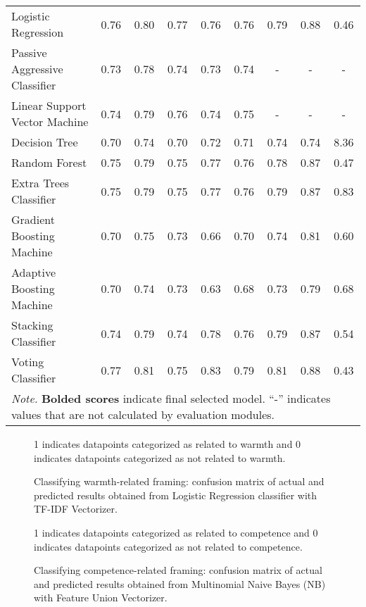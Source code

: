\documentclass[jou]{apa7}
\begin{document}
\begin{landscape}
\begin{longtable}[l]{lcccccccc}
    Logistic Regression & 0.76 & 0.80 & 0.77 & 0.76 & 0.76 & 0.79 & 0.88 & 0.46 \\
    Passive Aggressive Classifier & 0.73 & 0.78 & 0.74 & 0.73 & 0.74 & - & - & - \\
    Linear Support Vector Machine & 0.74 & 0.79 & 0.76 & 0.74 & 0.75 & - & - & - \\
    Decision Tree & 0.70 & 0.74 & 0.70 & 0.72 & 0.71 & 0.74 & 0.74 & 8.36 \\
    Random Forest & 0.75 & 0.79 & 0.75 & 0.77 & 0.76 & 0.78 & 0.87 & 0.47 \\
    Extra Trees Classifier & 0.75 & 0.79 & 0.75 & 0.77 & 0.76 & 0.79 & 0.87 & 0.83 \\
    Gradient Boosting Machine & 0.70 & 0.75 & 0.73 & 0.66 & 0.70 & 0.74 & 0.81 & 0.60 \\
    Adaptive Boosting Machine & 0.70 & 0.74 & 0.73 & 0.63 & 0.68 & 0.73 & 0.79 & 0.68 \\
    Stacking Classifier & 0.74 & 0.79 & 0.74 & 0.78 & 0.76 & 0.79 & 0.87 & 0.54 \\
    Voting Classifier & 0.77 & 0.81 & 0.75 & 0.83 & 0.79 & 0.81 & 0.88 & 0.43 \\ \hline
    \multicolumn{9}{l}{\textit{Note.} \textbf{Bolded scores} indicate final selected model. “-” indicates values that are not calculated by evaluation modules.}
    \end{longtable}
    \end{landscape}

\begin{figure*}
    \caption{Classifying warmth-related framing: confusion matrix of actual and predicted results obtained from Logistic Regression classifier with TF-IDF Vectorizer.}
    \label{figure6}
    \begin{figurenote}
        1 indicates datapoints categorized as related to warmth and 0 indicates datapoints categorized as not related to warmth.
        \end{figurenote}
    \end{figure*}

\begin{figure*}
    \caption{Classifying competence-related framing: confusion matrix of actual and predicted results obtained from Multinomial Naive Bayes (NB) with Feature Union Vectorizer.}
    \label{figure6}
    \begin{figurenote}
        1 indicates datapoints categorized as related to competence and 0 indicates datapoints categorized as not related to competence.
        \end{figurenote}
    \end{figure*}
\end{document}
